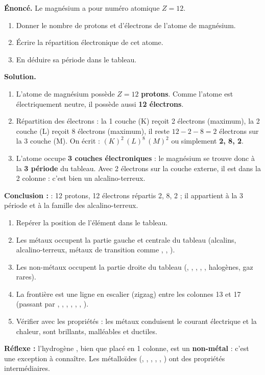 \documentclass[11pt]{article}
\newcommand{\cle}[1]{{\popxbold\color{popdark}#1}}
\begin{document}
\begin{exoresolu}
\textbf{Énoncé.} Le magnésium  a pour numéro atomique $Z = 12$.
\begin{enumerate}
\item Donner le nombre de protons et d'électrons de l'atome de magnésium.
\item Écrire la répartition électronique de cet atome.
\item En déduire sa période dans le tableau.
\end{enumerate}
\tcblower
\textbf{Solution.}
\begin{enumerate}
\item L'atome de magnésium possède $Z = 12$ \textbf{protons}. Comme l'atome est électriquement neutre, il possède aussi \textbf{12 électrons}.
\item Répartition des électrons : la 1 couche (K) reçoit 2 électrons (maximum), la 2 couche (L) reçoit 8 électrons (maximum), il reste $12 - 2 - 8 = 2$ électrons sur la 3 couche (M). On écrit : $(K)^2\,(L)^8\,(M)^2$ ou simplement \textbf{2, 8, 2}.
\item L'atome occupe \textbf{3 couches électroniques} : le magnésium se trouve donc à la \textbf{3 période} du tableau. Avec 2 électrons sur la couche externe, il est dans la 2 colonne : c'est bien un alcalino-terreux.
\end{enumerate}
\textbf{Conclusion :}  : 12 protons, 12 électrons répartis 2, 8, 2 ; il appartient à la 3 période et à la famille des alcalino-terreux.
\end{exoresolu}

\begin{methode}
\begin{enumerate}
\item Repérer la position de l'élément dans le tableau.
\item Les \cle{métaux} occupent la partie \cle{gauche et centrale} du tableau (alcalins, alcalino-terreux, métaux de transition comme , , ).
\item Les \cle{non-métaux} occupent la partie \cle{droite} du tableau (, , , , , halogènes, gaz rares).
\item La frontière est une ligne en escalier (zigzag) entre les colonnes 13 et 17 (passant par , , , , , , ).
\item Vérifier avec les propriétés : les métaux conduisent le courant électrique et la chaleur, sont brillants, malléables et ductiles.
\end{enumerate}
\textbf{Réflexe :} l'hydrogène , bien que placé en 1 colonne, est un \textbf{non-métal} : c'est une exception à connaître. Les métalloïdes (, , , , , ) ont des propriétés intermédiaires.
\end{methode}
\end{document}
